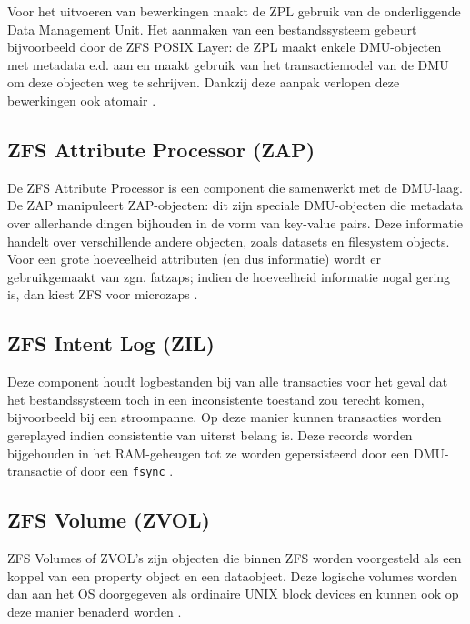Voor het uitvoeren van bewerkingen maakt de ZPL gebruik van de onderliggende Data Management Unit. Het aanmaken van een bestandssysteem gebeurt bijvoorbeeld door de ZFS POSIX Layer: de ZPL maakt enkele DMU-objecten met metadata e.d. aan en maakt gebruik van het transactiemodel van de DMU om deze objecten weg te schrijven. Dankzij deze aanpak verlopen deze bewerkingen ook \gls{atomair} \autocite{ZFSBonwick}. 

\subsection{ZFS Attribute Processor (ZAP)}

De ZFS Attribute Processor is een component die samenwerkt met de DMU-laag. De ZAP manipuleert ZAP-objecten: dit zijn speciale DMU-objecten die metadata over allerhande dingen bijhouden in de vorm van key-value pairs. Deze informatie handelt over verschillende andere objecten, zoals datasets en filesystem objects. Voor een grote hoeveelheid attributen (en dus informatie) wordt er gebruikgemaakt van zgn. fatzaps; indien de hoeveelheid informatie nogal gering is, dan kiest ZFS voor microzaps \autocite{Microsystems2006}.

\subsection{ZFS Intent Log (ZIL)}

Deze component houdt logbestanden bij van alle transacties voor het geval dat het bestandssysteem toch in een inconsistente toestand zou terecht komen, bijvoorbeeld bij een stroompanne. Op deze manier kunnen transacties worden gereplayed indien consistentie van uiterst belang is. Deze records worden bijgehouden in het RAM-geheugen tot ze worden gepersisteerd door een DMU-transactie of door een \texttt{fsync} \autocite{ZFSBonwick}. 

\subsection{ZFS Volume (ZVOL)}

ZFS Volumes of ZVOL's zijn objecten die binnen ZFS worden voorgesteld als een koppel van een property object en een dataobject. Deze logische volumes worden dan aan het OS doorgegeven als ordinaire UNIX block devices en kunnen ook op deze manier benaderd worden \autocite{Microsystems2006}.
